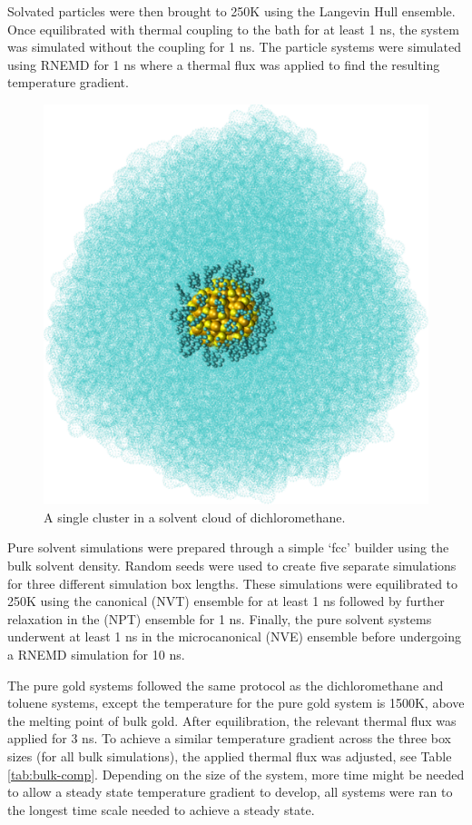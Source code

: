 Solvated particles were then brought to 250K using the Langevin Hull ensemble.\cite{Vardeman2011} 
Once equilibrated with thermal coupling to the bath for at least 1 ns, the system was simulated without the coupling for 1 ns. 
The particle systems were simulated using RNEMD for 1 ns where a thermal flux was applied to find the resulting temperature gradient. 
\begin{figure}
    \centering
    \includegraphics[scale=0.4]{figures/dcm-part.pdf}
    \caption{ A single  cluster in a solvent cloud of dichloromethane.}
    \label{fig:lambda-bulk}
\end{figure}

Pure solvent simulations were prepared through a simple `fcc' builder using the bulk solvent density. 
Random seeds were used to create five separate simulations for three different simulation box lengths.
These simulations were equilibrated to 250K using the canonical (NVT) ensemble for at least 1 ns followed by further relaxation in the (NPT) ensemble for 1 ns.
Finally, the pure solvent systems underwent at least 1 ns in the microcanonical (NVE) ensemble before undergoing a RNEMD simulation for 10 ns.

The pure gold systems followed the same protocol as the dichloromethane and toluene systems, except the temperature for the pure gold system is 1500K, above the melting point of bulk gold.
After equilibration, the relevant thermal flux was applied for 3 ns.
To achieve a similar temperature gradient across the three box sizes (for all bulk simulations), the applied thermal flux was adjusted, see Table \ref{tab:bulk-comp}.
Depending on the size of the system, more time might be needed to allow a steady state temperature gradient to develop, all systems were ran to the longest time scale needed to achieve a steady state.

